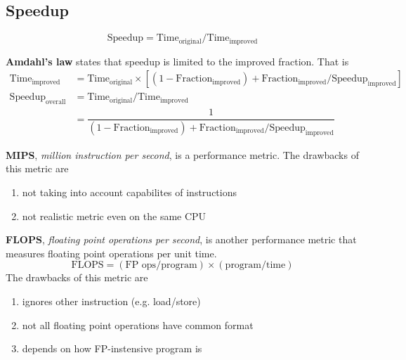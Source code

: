 \subsection{Speedup}
\begin{equation*}
    \text{Speedup} = \text{Time}_{\text{original}} / \text{Time}_{\text{improved}}
\end{equation*}

\textbf{Amdahl's law} states that speedup is limited to the improved fraction. That is
\begin{align*}
    \text{Time}_{\text{improved}}   & = \text{Time}_{\text{original}} \times \left[ \left( 1 - \text{Fraction}_{\text{improved}} \right) + \text{Fraction}_{\text{improved}} / \text{Speedup}_{\text{improved}} \right] \\
    \text{Speedup}_{\text{overall}} & = \text{Time}_{\text{original}} / \text{Time}_{\text{improved}}                                                                                                                   \\
                                    & = \dfrac{1}{ \left( 1 - \text{Fraction}_{\text{improved}} \right) + \text{Fraction}_{\text{improved}} / \text{Speedup}_{\text{improved}}}
\end{align*}

\textbf{MIPS}, \textit{million instruction per second}, is a performance metric. The drawbacks of this metric are
\begin{enumerate}
    \item not taking into account capabilites of instructions
    \item not realistic metric even on the same CPU
\end{enumerate}

\textbf{FLOPS}, \textit{floating point operations per second}, is another performance metric that measures floating point operations per unit time.
\begin{equation*}
    \text{FLOPS} = (\text{FP ops}/\text{program}) \times (\text{program} / \text{time})
\end{equation*}
The drawbacks of this metric are
\begin{enumerate}
    \item ignores other instruction (e.g. load/store)
    \item not all floating point operations have common format
    \item depends on how FP-instensive program is
\end{enumerate}

